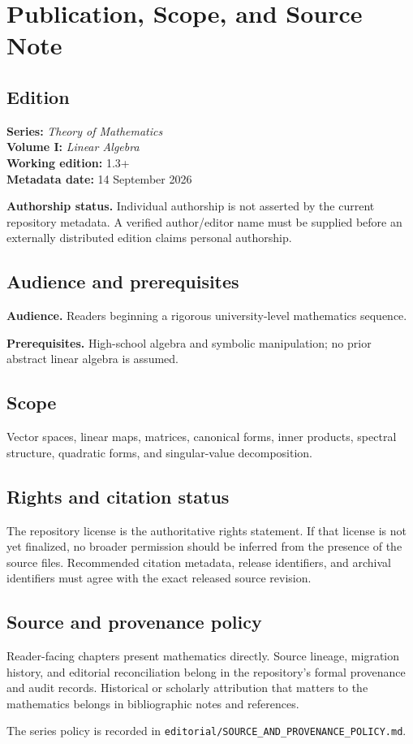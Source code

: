 \chapter*{Publication, Scope, and Source Note}
{}

\section*{Edition}
\textbf{Series:} \emph{Theory of Mathematics}\\
\textbf{Volume I:} \emph{Linear Algebra}\\
\textbf{Working edition:} 1.3+\\
\textbf{Metadata date:} 14 September 2026

\textbf{Authorship status.} Individual authorship is not asserted by the current repository metadata. A verified author/editor name must be supplied before an externally distributed edition claims personal authorship.

\section*{Audience and prerequisites}
\textbf{Audience.} Readers beginning a rigorous university-level mathematics sequence.

\textbf{Prerequisites.} High-school algebra and symbolic manipulation; no prior abstract linear algebra is assumed.

\section*{Scope}
Vector spaces, linear maps, matrices, canonical forms, inner products, spectral structure, quadratic forms, and singular-value decomposition.

\section*{Rights and citation status}
The repository license is the authoritative rights statement. If that license is
not yet finalized, no broader permission should be inferred from the presence of
the source files. Recommended citation metadata, release identifiers, and
archival identifiers must agree with the exact released source revision.

\section*{Source and provenance policy}
Reader-facing chapters present mathematics directly. Source lineage, migration
history, and editorial reconciliation belong in the repository's formal
provenance and audit records. Historical or scholarly attribution that matters
to the mathematics belongs in bibliographic notes and references.

The series policy is recorded in
\texttt{editorial/SOURCE\_AND\_PROVENANCE\_POLICY.md}.
